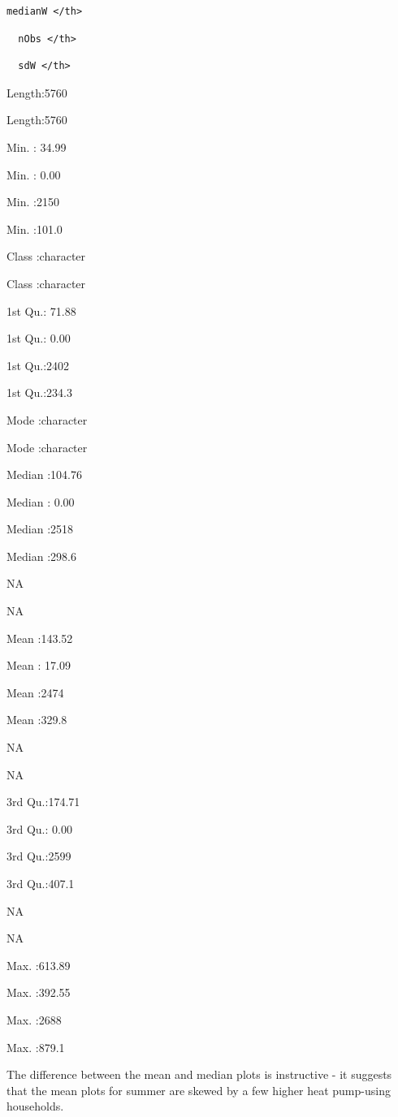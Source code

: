 \documentclass[]{article}
\begin{document}
\begin{verbatim}
medianW </th>
\end{verbatim}

\begin{verbatim}
  nObs </th>
\end{verbatim}

\begin{verbatim}
  sdW </th>
\end{verbatim}

Length:5760

Length:5760

Min. : 34.99

Min. : 0.00

Min. :2150

Min. :101.0

Class :character

Class :character

1st Qu.: 71.88

1st Qu.: 0.00

1st Qu.:2402

1st Qu.:234.3

Mode :character

Mode :character

Median :104.76

Median : 0.00

Median :2518

Median :298.6

NA

NA

Mean :143.52

Mean : 17.09

Mean :2474

Mean :329.8

NA

NA

3rd Qu.:174.71

3rd Qu.: 0.00

3rd Qu.:2599

3rd Qu.:407.1

NA

NA

Max. :613.89

Max. :392.55

Max. :2688

Max. :879.1

The difference between the mean and median plots is instructive - it
suggests that the mean plots for summer are skewed by a few higher heat
pump-using households.
\end{document}
